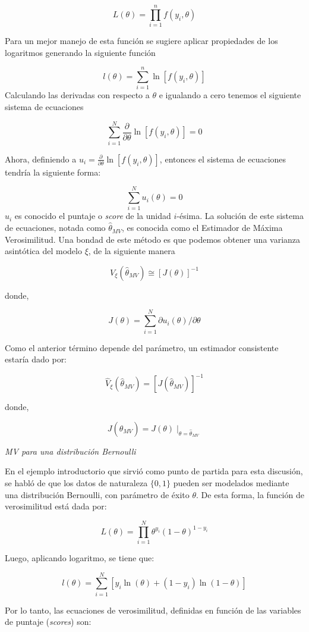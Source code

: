\documentclass[
  12pt,
]{book}
\begin{document}
\[
L(\theta)=\prod_{i=1}^{n}f(y_{i},\theta)
\]

Para un mejor manejo de esta función se sugiere aplicar propiedades de los logaritmos generando la siguiente función

\[
l(\theta)=\sum_{i=1}^{n}\ln[f(y_{i},\theta)]
\]
Calculando las derivadas con respecto a \(\theta\) e igualando a cero tenemos el siguiente sistema de ecuaciones

\[
\sum_{i=1}^{N}\frac{\partial}{\partial\theta}\ln[f(y_{i},\theta)]=0
\]

Ahora, definiendo a \(u_{i}=\frac{\partial}{\partial\theta}\ln[f(y_{i},\theta)]\), entonces el sistema de ecuaciones tendría la siguiente forma:

\[
\sum_{i=1}^{N}u_{i}(\theta)=0
\]
\(u_{i}\) es conocido el puntaje o \emph{score} de la unidad \(i\)-ésima. La solución de este sistema de ecuaciones, notada como \(\hat{\theta}_{MV}\), es conocida como el Estimador de Máxima Verosimilitud. Una bondad de este método es que podemos obtener una varianza asintótica del modelo \(\xi\), de la siguiente manera

\[
V_{\xi}(\hat{\theta}_{MV})\cong[J(\theta)]^{-1}
\]

donde,

\[
J(\theta)=\sum_{i=1}^{N}\partial u_{i}(\theta)/\partial\theta
\]

Como el anterior término depende del parámetro, un estimador consistente estaría dado por:

\[
\hat{V}_{\xi}(\hat{\theta}_{MV})=[J(\hat{\theta}_{MV})]^{-1}
\]

donde,

\[
J(\hat{\theta}_{MV})=J(\theta)\mid_{\theta=\hat{\theta}_{MV}}
\]

\emph{MV para una distribución Bernoulli}

En el ejemplo introductorio que sirvió como punto de partida para esta discusión, se habló de que los datos de naturaleza \(\{0,1\}\) pueden ser modelados mediante una distribución Bernoulli, con parámetro de éxito \(\theta\). De esta forma, la función de verosimilitud está dada por:

\[
L(\theta)  =\prod_{i=1}^{N}\theta^{y_{i}}(1-\theta)^{1-y_{i}}
\]

Luego, aplicando logaritmo, se tiene que:

\[
l(\theta)  =\sum_{i=1}^{N}\left[{y_{i}}\ln(\theta)+(1-y_{i})\ln(1-\theta)\right]
\]

Por lo tanto, las ecuaciones de verosimilitud, definidas en función de las variables de puntaje (\emph{scores}) son:
\end{document}
